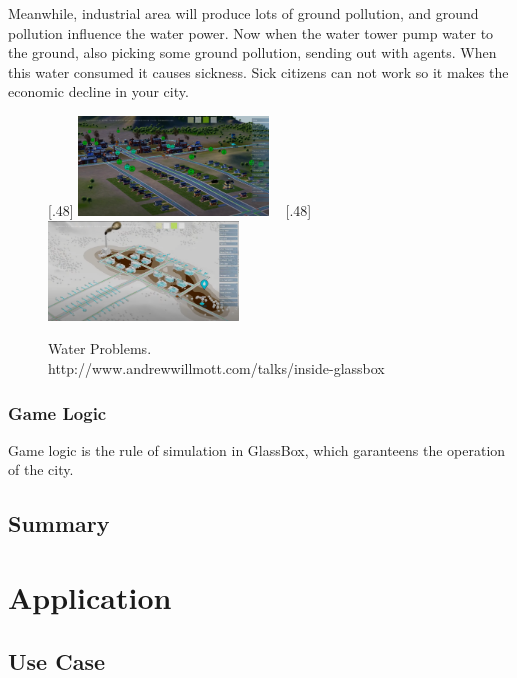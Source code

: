 Meanwhile, industrial area will produce lots of ground pollution, and ground pollution influence the water power. Now when the water tower pump water to the ground, also picking some ground pollution, sending out with agents. When this water consumed it causes sickness. Sick citizens can not work so it makes the economic decline in your city.

\begin{figure}[htb]
	\centering	
	[.48\linewidth]{
		\includegraphics[width=0.45\textwidth]{gfx/water_5} 	
	}  	
	~
	[.48\linewidth]{
		\includegraphics[width=0.45\textwidth]{gfx/water_6}  	
	}	  
	
	\caption{Water Problems.\\ http://www.andrewwillmott.com/talks/inside-glassbox}
	\label{fig:ex_5}
\end{figure}

\subsection{Game Logic}

Game logic is the rule of simulation in GlassBox, which garanteens the operation of the city. 

\section{Summary}

\chapter{Application}

\section{Use Case}

